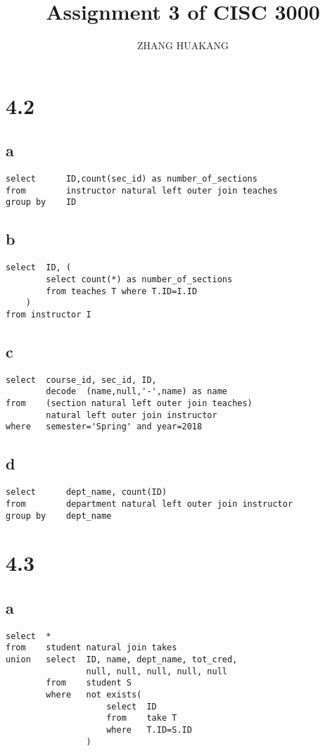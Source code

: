 \documentclass{article}
\title{Assignment 3 of CISC 3000}
\author{ZHANG HUAKANG}
\begin{document}
    \maketitle
    \section*{4.2}
    \subsection*{a}
    \begin{verbatim}
select      ID,count(sec_id) as number_of_sections
from        instructor natural left outer join teaches
group by    ID
    \end{verbatim}
    \subsection*{b}
    \begin{verbatim}
select  ID, (
        select count(*) as number_of_sections
        from teaches T where T.ID=I.ID
    )
from instructor I
    \end{verbatim}
    \subsection*{c}
    \begin{verbatim}
select  course_id, sec_id, ID,
        decode  (name,null,'-',name) as name
from    (section natural left outer join teaches)
        natural left outer join instructor
where   semester='Spring' and year=2018
    \end{verbatim}
    \subsection*{d}
    \begin{verbatim}
select      dept_name, count(ID)
from        department natural left outer join instructor
group by    dept_name
    \end{verbatim}
    \section*{4.3}
    \subsection*{a}
    \begin{verbatim}
select  *
from    student natural join takes
union   select  ID, name, dept_name, tot_cred, 
                null, null, null, null, null
        from    student S
        where   not exists(
                    select  ID
                    from    take T
                    where   T.ID=S.ID
                )
    \end{verbatim}
\end{document}
